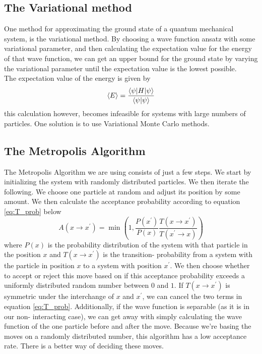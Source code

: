\documentclass[11pt,a4paper,titlepage]{article}
\begin{document}
\subsection{The Variational method}
One method for approximating the ground state of a quantum mechanical system, is the variational method. By choosing a wave function ansatz with some variational parameter, and then calculating the expectation value for the energy of that wave function, we can get an upper bound for the ground state by varying the variational parameter until the expectation value is the lowest possible.\\The expectation value of the energy is given by
\begin{equation}
\braket{E} = \frac{\braket{\psi | H | \psi	}}{\braket{\psi|\psi}}
\end{equation}
this calculation however, becomes infeasible for systems with large numbers of particles. One solution is to use Variational Monte Carlo methods.
\subsection{The Metropolis Algorithm}
The Metropolis Algorithm we are using consists of just a few steps. We start by initializing the system with randomly distributed particles. We then iterate the following. We choose one particle at random and adjust its position by some amount. We then calculate the acceptance probability according to equation \eqref{eq:T_prob} below
\begin{equation}
A\left(x\rightarrow x^{\prime}\right)=\min \left(1, \frac{P\left(x^{\prime}\right)}{P\left(x\right)} \frac{T\left(x\rightarrow x^{\prime}\right)}{T\left(x^{\prime}\rightarrow x\right)}\right)\label{eq:T_prob}
\end{equation}
where $P(x)$ is the probability distribution of the system with that particle in the position $x$ and $T\left(x\rightarrow x^{\prime}\right)$ is the transition- probability from a system with the particle in position $x$ to a system with position $x^{\prime}$.
We then choose whether to accept or reject this move based on if this acceptance probability exceeds a uniformly distributed random number between $0$ and $1$. If $T\left(x\rightarrow x^{\prime}\right)$ is symmetric under the interchange of $x$ and $x^{\prime}$, we can cancel the two terms in equation \eqref{eq:T_prob}. Additionally, if the wave function is separable (as it is in our non- interacting case), we can get away with simply calculating the wave function of the one particle before and after the move. Because we're basing the moves on a randomly distributed number, this algorithm has a low acceptance rate. There is a better way of deciding these moves.
\end{document}
